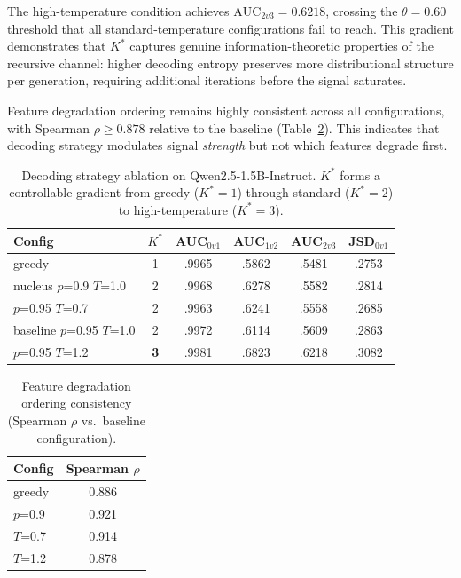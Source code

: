 \documentclass[11pt,a4paper]{article}
\begin{document}
The high-temperature condition achieves $\text{AUC}_{2v3} = 0.6218$, crossing the $\theta=0.60$ threshold that all standard-temperature configurations fail to reach.
This gradient demonstrates that $K^*$ captures genuine information-theoretic properties of the recursive channel: higher decoding entropy preserves more distributional structure per generation, requiring additional iterations before the signal saturates.

Feature degradation ordering remains highly consistent across all configurations, with Spearman $\rho \geq 0.878$ relative to the baseline (Table~\ref{tab:feature_ordering}).
This indicates that decoding strategy modulates signal \emph{strength} but not which features degrade first.

\begin{table}[t]
\centering
\small
\caption{Decoding strategy ablation on Qwen2.5-1.5B-Instruct. $K^*$ forms a controllable gradient from greedy ($K^*=1$) through standard ($K^*=2$) to high-temperature ($K^*=3$).}
\label{tab:decoding}
\begin{tabular}{lccccc}
\toprule
\textbf{Config} & \textbf{$K^*$} & \textbf{AUC$_{0v1}$} & \textbf{AUC$_{1v2}$} & \textbf{AUC$_{2v3}$} & \textbf{JSD$_{0v1}$} \\
\midrule
greedy & 1 & .9965 & .5862 & .5481 & .2753 \\
nucleus $p$=0.9 $T$=1.0 & 2 & .9968 & .6278 & .5582 & .2814 \\
$p$=0.95 $T$=0.7 & 2 & .9963 & .6241 & .5558 & .2685 \\
baseline $p$=0.95 $T$=1.0 & 2 & .9972 & .6114 & .5609 & .2863 \\
$p$=0.95 $T$=1.2 & \textbf{3} & .9981 & .6823 & .6218 & .3082 \\
\bottomrule
\end{tabular}
\end{table}

\begin{table}[t]
\centering
\small
\caption{Feature degradation ordering consistency (Spearman $\rho$ vs.\ baseline configuration).}
\label{tab:feature_ordering}
\begin{tabular}{lc}
\toprule
\textbf{Config} & \textbf{Spearman $\rho$} \\
\midrule
greedy & 0.886 \\
$p$=0.9 & 0.921 \\
$T$=0.7 & 0.914 \\
$T$=1.2 & 0.878 \\
\bottomrule
\end{tabular}
\end{table}
\end{document}
